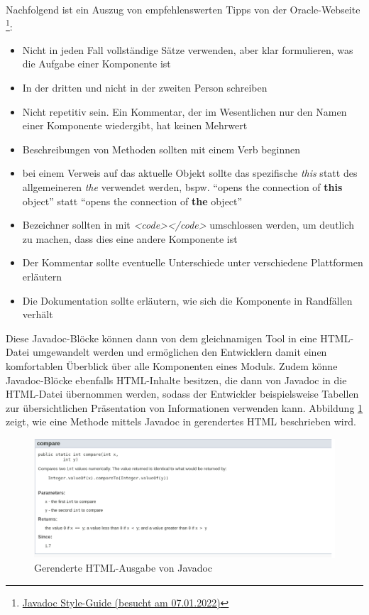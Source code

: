 Nachfolgend ist ein Auszug von empfehlenswerten Tipps von der Oracle-Webseite \footnote{\href{https://www.oracle.com/technical-resources/articles/java/javadoc-tool.html}{Javadoc Style-Guide (besucht am 07.01.2022)} }:
\begin{itemize}
    \item Nicht in jeden Fall vollständige Sätze verwenden, aber klar formulieren, was die Aufgabe einer Komponente ist
    \item In der dritten und nicht in der zweiten Person schreiben
    \item Nicht repetitiv sein. Ein Kommentar, der im Wesentlichen nur den Namen einer Komponente wiedergibt, hat keinen Mehrwert
    \item  Beschreibungen von Methoden sollten mit einem Verb beginnen
    \item bei einem Verweis auf das aktuelle Objekt sollte das spezifische \textit{this} statt des allgemeineren \textit{the} verwendet werden, bspw. \enquote{opens the connection of \textbf{this} object} statt \enquote{opens the connection of \textbf{the} object}
    \item Bezeichner sollten in mit \textit{<code></code>} umschlossen werden, um deutlich zu machen, dass dies eine andere Komponente ist
    \item Der Kommentar sollte eventuelle Unterschiede unter verschiedene Plattformen erläutern
    \item Die Dokumentation sollte erläutern, wie sich die Komponente in Randfällen verhält
    
\end{itemize}
Diese Javadoc-Blöcke können dann von dem gleichnamigen Tool in eine HTML-Datei umgewandelt werden und ermöglichen den Entwicklern damit einen komfortablen Überblick über alle Komponenten eines Moduls. Zudem könne Javadoc-Blöcke ebenfalls HTML-Inhalte besitzen, die dann von Javadoc in die HTML-Datei übernommen werden, sodass der Entwickler beispielsweise Tabellen zur übersichtlichen Präsentation  von Informationen verwenden kann. Abbildung \ref{fig:javadoc_example_screenshot} zeigt, wie eine Methode mittels Javadoc in gerendertes HTML beschrieben wird. 
\begin{figure}[h]
    \centering
    \includegraphics[width=\columnwidth]{figures/javadoc_screenshot.png}
    \caption{Gerenderte HTML-Ausgabe von Javadoc}
    \label{fig:javadoc_example_screenshot}
\end{figure}

